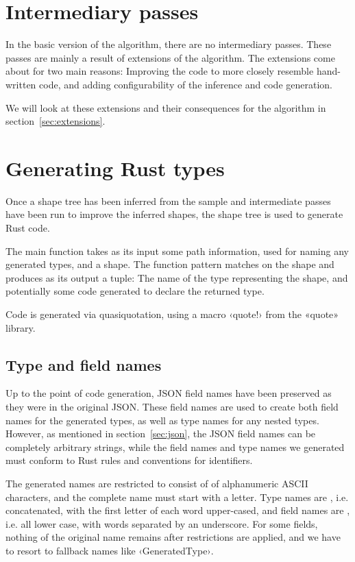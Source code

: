 \section{Intermediary passes}

In the basic version of the algorithm, there are no intermediary passes. These passes are mainly a result of extensions of the algorithm. The extensions come about for two main reasons: Improving the code to more closely resemble hand-written code, and adding configurability of the inference and code generation.

We will look at these extensions and their consequences for the algorithm in section~\ref{sec:extensions}.

\section{Generating Rust types}

Once a shape tree has been inferred from the sample and intermediate passes have been run to improve the inferred shapes, the shape tree is used to generate Rust code.

The main function takes as its input some path information, used for naming any generated types, and a shape. The function pattern matches on the shape and produces as its output a tuple: The name of the type representing the shape, and potentially some code generated to declare the returned type.

Code is generated via quasiquotation, using a macro ‹quote!› from the «quote»  \cite{quote} library.


\subsection{Type and field names}

Up to the point of code generation, JSON field names have been preserved as they were in the original JSON. These field names are used to create both field names for the generated types, as well as type names for any nested types. However, as mentioned in section~\ref{sec:json}, the JSON field names can be completely arbitrary strings, while the field names and type names we generated must conform to Rust rules and conventions for identifiers.

The generated names are restricted to consist of  of alphanumeric ASCII characters, and the complete name must start with a letter. Type names are , i.e. concatenated, with the first letter of each word upper-cased, and field names are , i.e. all lower case, with words separated by an underscore. For some fields, nothing of the original name remains after restrictions are applied, and we have to resort to fallback names like ‹GeneratedType›.

